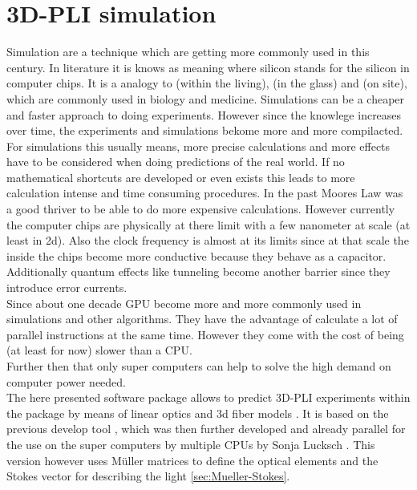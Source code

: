 \setcounter{chapter}{4}
\chapter{\acs{3D-PLI} simulation}
\label{cha:sof:simulation}
% 
Simulation are a technique which are getting more commonly used in this century.
In literature it is knows as  meaning  where silicon stands for the silicon in computer chips.
It is a analogy to  (within the living),  (in the glass) and  (on site), which are commonly used in biology and medicine.
Simulations can be a cheaper and faster approach to doing experiments.
However since the knowlege increases over time, the experiments and simulations bekome more and more compilacted.
For simulations this usually means, more precise calculations and more effects have to be considered when doing predictions of the real world.
If no mathematical shortcuts are developed or even exists this leads to more calculation intense and time consuming procedures.
In the past Moores Law was a good thriver to be able to do more expensive calculations.
However currently the computer chips are physically at there limit with a few nanometer at scale (at least in 2d).
Also the clock frequency is almost at its limits since at that scale the  inside the chips become more conductive because they behave as a capacitor.
Additionally quantum effects like tunneling become another barrier since they introduce error currents.
\\
% 
Since about one decade \acs{GPU} become more and more commonly used in simulations and other algorithms.
They have the advantage of calculate a lot of parallel instructions at the same time.
However they come with the cost of being (at least for now) slower than a \ac{CPU}.
\\
% 
Further then that only super computers can help to solve the high demand on computer power needed.
\\[\baselineskip]
% 
The here presented \fastpli{} software package allows to predict \ac{3D-PLI} experiments within the \python package  by means of linear optics \cite{} and 3d fiber models \cite{}.
It is based on the previous develop tool \simpli{} \cite{Dohmen2015}, which was then further developed and already parallel for the use on the super computers by multiple \acp{CPU} by Sonja Lucksch \cite{Lucksch2016}.
This version however uses M\"uller matrices \cite{} to define the optical elements and the Stokes vector \cite{} for describing the light \cref{sec:Mueller-Stokes}.
